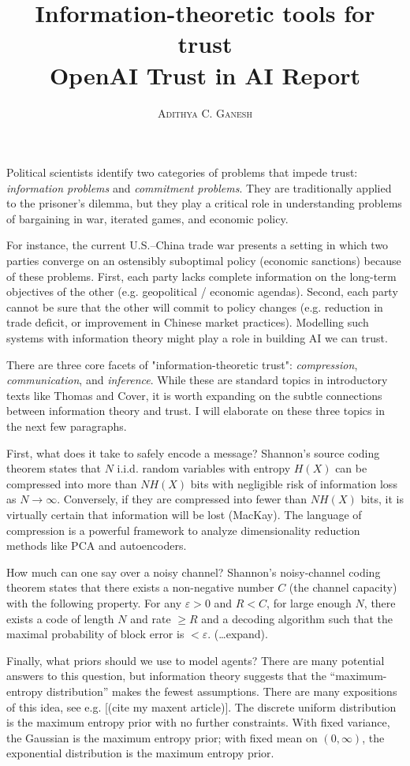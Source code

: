\documentclass[11pt]{article}
\title{Information-theoretic tools for trust \\ \vspace{0.3cm} OpenAI Trust in AI Report}
\author{\textsc{Adithya C. Ganesh}}
\begin{document}
Political scientists identify two categories of problems that impede trust: {\it information problems} and {\it commitment problems}.  They are traditionally applied to the prisoner's dilemma, but they play a critical role in understanding problems of bargaining in war, iterated games, and economic policy.

For instance, the current U.S.--China trade war presents a setting in which two parties converge on an ostensibly suboptimal policy (economic sanctions) because of these problems.  First, each party lacks complete information on the long-term objectives of the other (e.g. geopolitical / economic agendas).  Second, each party cannot be sure that the other will commit to policy changes (e.g. reduction in trade deficit, or improvement in Chinese market practices).  Modelling such systems with information theory might play a role in building AI we can trust.

There are three core facets of "information-theoretic trust": {\it compression}, {\it communication}, and {\it inference}.  While these are standard topics in introductory texts like Thomas and Cover, it is worth expanding on the subtle connections between information theory and trust.  I will elaborate on these three topics in the next few paragraphs.

First, what does it take to safely encode a message?  Shannon's source coding theorem states that $N$ i.i.d. random variables with entropy $H(X)$ can be compressed into more than $N H(X)$ bits with negligible risk of information loss as $N \to \infty$.  Conversely, if they are compressed into fewer than $N H(X)$ bits, it is virtually certain that information will be lost (MacKay).  The language of compression is a powerful framework to analyze dimensionality reduction methods like PCA and autoencoders.

How much can one say over a noisy channel?  Shannon's noisy-channel coding theorem states that there exists a non-negative number $C$ (the channel capacity) with the following property.  For any $\varepsilon > 0$ and $R < C$, for large enough $N$, there exists a code of length $N$ and rate $\geq R$ and a decoding algorithm such that the maximal probability of block error is $< \varepsilon$.  (\dots expand).

Finally, what priors should we use to model agents?  There are many potential answers to this question, but information theory suggests that the ``maximum-entropy distribution'' makes the fewest assumptions.  There are many expositions of this idea, see e.g. [(cite my maxent article)].  The discrete uniform distribution is the maximum entropy prior with no further constraints.  With fixed variance, the Gaussian is the maximum entropy prior; with fixed mean on $(0, \infty)$, the exponential distribution is the maximum entropy prior.
\end{document}
